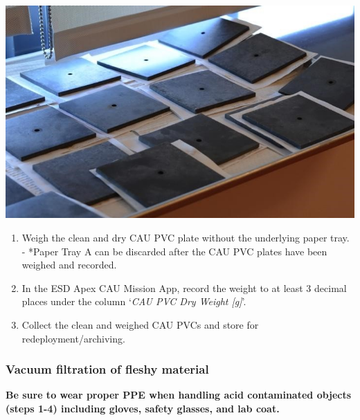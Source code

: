 \documentclass[]{book}
\begin{document}
\includegraphics{images/CAU_drying.jpg}

\begin{enumerate}
\def\labelenumi{\arabic{enumi}.}
\setcounter{enumi}{12}
\item
  Weigh the clean and dry CAU PVC plate without the underlying paper tray. - *Paper Tray A can be discarded after the CAU PVC plates have been weighed and recorded.
\item
  In the ESD Apex CAU Mission App, record the weight to at least 3 decimal places under the column `\emph{CAU PVC Dry Weight {[}g{]}}'.
\item
  Collect the clean and weighed CAU PVCs and store for redeployment/archiving.
\end{enumerate}

\hypertarget{vacuum-filtration-of-fleshy-material}{%
\subsubsection{Vacuum filtration of fleshy material}\label{vacuum-filtration-of-fleshy-material}}

\textbf{Be sure to wear proper PPE when handling acid contaminated objects (steps 1-4) including gloves, safety glasses, and lab coat.}
\end{document}
